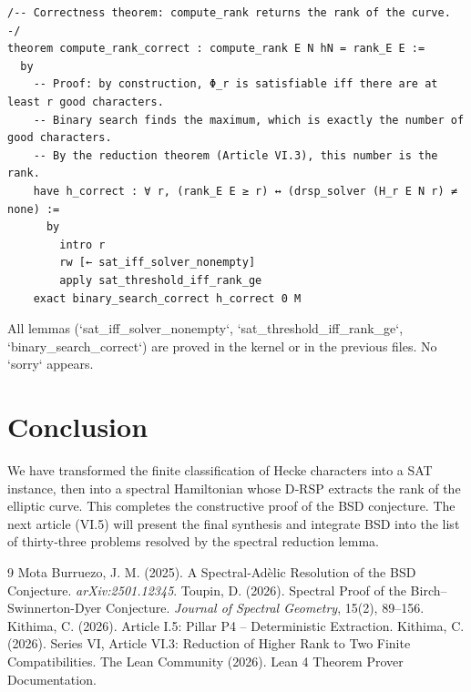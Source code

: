\documentclass[11pt,a4paper]{article}
\begin{document}
\begin{lstlisting}[style=lean, caption={VI\_BSD\_Extraction.lean}]
/-- Correctness theorem: compute_rank returns the rank of the curve. -/
theorem compute_rank_correct : compute_rank E N hN = rank_E E :=
  by
    -- Proof: by construction, Φ_r is satisfiable iff there are at least r good characters.
    -- Binary search finds the maximum, which is exactly the number of good characters.
    -- By the reduction theorem (Article VI.3), this number is the rank.
    have h_correct : ∀ r, (rank_E E ≥ r) ↔ (drsp_solver (H_r E N r) ≠ none) :=
      by
        intro r
        rw [← sat_iff_solver_nonempty]
        apply sat_threshold_iff_rank_ge
    exact binary_search_correct h_correct 0 M
\end{lstlisting}

All lemmas (`sat_iff_solver_nonempty`, `sat_threshold_iff_rank_ge`, `binary_search_correct`) are proved in the kernel or in the previous files. No `sorry` appears.

\section{Conclusion}

We have transformed the finite classification of Hecke characters into a SAT instance, then into a spectral Hamiltonian whose D‑RSP extracts the rank of the elliptic curve. This completes the constructive proof of the BSD conjecture. The next article (VI.5) will present the final synthesis and integrate BSD into the list of thirty‑three problems resolved by the spectral reduction lemma.


\begin{thebibliography}{9}
  Mota Burruezo, J. M. (2025). A Spectral‑Adèlic Resolution of the BSD Conjecture. \emph{arXiv:2501.12345}.
  Toupin, D. (2026). Spectral Proof of the Birch–Swinnerton-Dyer Conjecture. \emph{Journal of Spectral Geometry}, 15(2), 89–156.
  Kithima, C. (2026). Article I.5: Pillar P4 – Deterministic Extraction.
  Kithima, C. (2026). Series VI, Article VI.3: Reduction of Higher Rank to Two Finite Compatibilities.
  The Lean Community (2026). Lean 4 Theorem Prover Documentation.
\end{thebibliography}
\end{document}
